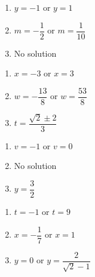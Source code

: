 \documentclass{ximera}
\begin{document}
\begin{multicols}{3}
\begin{enumerate}
\setcounter{enumi}{\value{HW}}

\item  $y = -1$ or $y= 1$

\item $m=-\dfrac{1}{2}$ or $m= \dfrac{1}{10}$

\item No solution

\setcounter{HW}{\value{enumi}}
\end{enumerate}
\end{multicols}

\begin{multicols}{3}
\begin{enumerate}
\setcounter{enumi}{\value{HW}}

\item  $x=-3$ or $x= 3$

\item $w = -\dfrac{13}{8}$ or $w= \dfrac{53}{8}$

\item $t = \dfrac{\sqrt{2} \pm 2}{3}$


\setcounter{HW}{\value{enumi}}
\end{enumerate}
\end{multicols}


\begin{multicols}{3}
\begin{enumerate}
\setcounter{enumi}{\value{HW}}

\item $v = -1$ or $v = 0$ 

\item  No solution

\item  $y = \dfrac{3}{2}$

\setcounter{HW}{\value{enumi}}
\end{enumerate}
\end{multicols}



\begin{multicols}{3} 
\begin{enumerate}
\setcounter{enumi}{\value{HW}}

\item $t = -1$ or $t = 9$

\item $x = -\dfrac{1}{7}$ or $x = 1$

\item $y = 0$ or $y = \dfrac{2}{\sqrt{2} - 1}$ 

\setcounter{HW}{\value{enumi}}
\end{enumerate}
\end{multicols}
\end{document}
